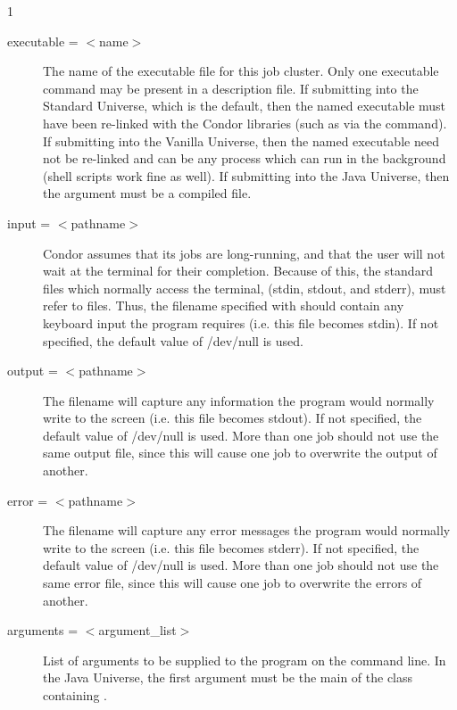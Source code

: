 \begin{ManPage}{\label{man-condor-submit}}{1}
\begin{description}
\item[executable = $<$name$>$]The name of the executable file for this
job cluster. Only one executable command may be present in a description
file. If submitting into the Standard Universe, which is the default,
then the named executable must have been re-linked with the Condor
libraries (such as via the  command). If submitting into
the Vanilla Universe, then the named executable need not be re-linked and
can be any process which can run in the background (shell scripts work
fine as well).  If submitting into the Java Universe, then the argument
must be a compiled  file.



\item[input = $<$pathname$>$] Condor assumes that its jobs are
long-running, and that the user will not wait at the terminal for their
completion. Because of this, the standard files which normally access
the terminal, (stdin, stdout, and stderr), must refer to files. Thus,
the filename specified with  should contain any keyboard
input the program requires (i.e. this file becomes stdin). If not
specified, the default value of /dev/null is used. 


\item[output = $<$pathname$>$] The  filename will capture
any information the program would normally write to the screen (i.e.
this file becomes stdout). If not specified, the default value of
/dev/null is used. More than one job should not use the same output
file, since this will cause one job to overwrite the output of
another.


\item[error = $<$pathname$>$] The  filename will capture any
error messages the program would normally write to the screen (i.e. this
file becomes stderr). If not specified, the default value of /dev/null
is used. More than one job should not use the same error file, since
this will cause one job to overwrite the errors of another.


\item[arguments = $<$argument\_list$>$] List of arguments to be supplied
to the program on the command line.   In the Java Universe, the first
argument must be the main of the class containing .



\end{description}
\end{ManPage}
